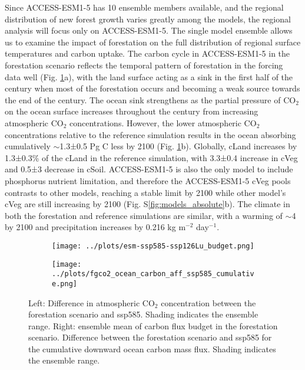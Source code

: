 \documentclass[]{article}
\begin{document}
Since ACCESS-ESM1-5 has 10 ensemble members available, and the regional distribution of new forest growth varies greatly among the models, the regional analysis will focus only on ACCESS-ESM1-5.
The single model ensemble allows us to examine the impact of forestation on the full distribution of regional surface temperatures and carbon uptake.
The carbon cycle in ACCESS-ESM1-5 in the forestation scenario reflects the temporal pattern of forestation in the forcing data well (Fig. \ref{fig:global_carbon_budget}a), with the land surface acting as a sink in the first half of the century when most of the forestation occurs and becoming a weak source towards the end of the century.
The ocean sink strengthens as the partial pressure of CO$_2$ on the ocean surface increases throughout the century from increasing atmospheric CO$_2$ concentrations.
However, the lower atmospheric CO$_2$ concentrations relative to the reference simulation results in the ocean absorbing cumulatively $\sim$1.3±0.5 Pg C less by 2100 (Fig. \ref{fig:global_carbon_budget}b).
Globally, cLand increases by 1.3±0.3\% of the cLand in the reference simulation, with 3.3±0.4 increase in cVeg and 0.5±3 decrease in cSoil.
ACCESS-ESM1-5 is also the only model to include phosphorus nutrient limitation, and therefore the ACCESS-ESM1-5 cVeg pools contrasts to other models, reaching a stable limit by 2100 while other model's cVeg are still increasing by 2100 (Fig. S\ref{fig:models_absolute}b).
The climate in both the forestation and reference simulations are similar, with a warming of $\sim$4 \textcelsius{} by 2100 and precipitation increases by 0.216 kg m$^{-2}$ day$^{-1}$.

\begin{figure}[H]
    \centering
    \begin{subfigure}[b]{0.4\linewidth}
        \texttt{[image: ../plots/esm-ssp585-ssp126Lu\_budget.png]}
    \end{subfigure}
    \begin{subfigure}[b]{0.4\linewidth}
        \texttt{[image: ../plots/fgco2\_ocean\_carbon\_aff\_ssp585\_cumulative.png]}
    \end{subfigure}
    \caption{Left: Difference in atmospheric CO$_2$ concentration between the forestation scenario and ssp585. Shading indicates the ensemble range. Right: ensemble mean of carbon flux budget in the forestation scenario. Difference between the forestation scenario and ssp585 for the cumulative downward ocean carbon mass flux. Shading indicates the ensemble range.}
    \label{fig:global_carbon_budget}
\end{figure}
\end{document}

